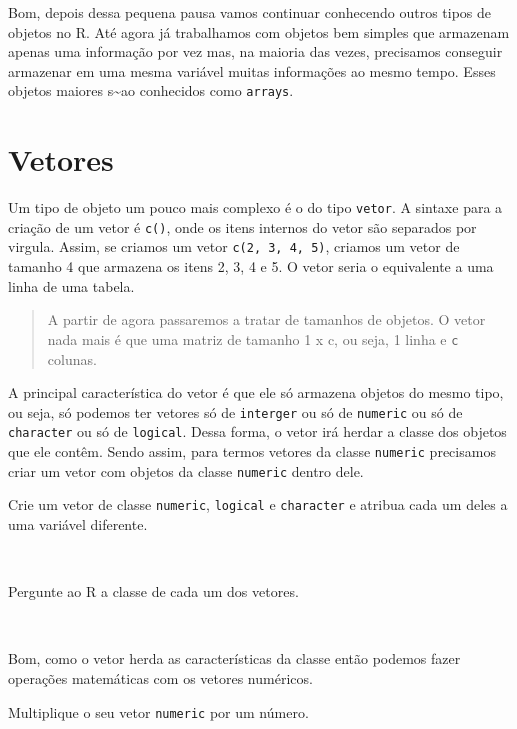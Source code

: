 \documentclass[]{book}
\theoremstyle{definition}
\theoremstyle{definition}
\theoremstyle{definition}
\theoremstyle{remark}
\let\BeginKnitrBlock\begin \let\EndKnitrBlock\end
\begin{document}
Bom, depois dessa pequena pausa vamos continuar conhecendo outros tipos de objetos no R. Até agora já trabalhamos com objetos bem simples que armazenam apenas uma informação por vez mas, na maioria das vezes, precisamos conseguir armazenar em uma mesma variável muitas informações ao mesmo tempo. Esses objetos maiores s\textasciitilde{}ao conhecidos como \texttt{arrays}.

\hypertarget{vetores}{%
\section{Vetores}\label{vetores}}

Um tipo de objeto um pouco mais complexo é o do tipo \texttt{vetor}. A sintaxe para a criação de um vetor é \texttt{c()}, onde os itens internos do vetor são separados por virgula. Assim, se criamos um vetor \texttt{c(2,\ 3,\ 4,\ 5)}, criamos um vetor de tamanho 4 que armazena os itens 2, 3, 4 e 5. O vetor seria o equivalente a uma linha de uma tabela.

\begin{quote}
A partir de agora passaremos a tratar de tamanhos de objetos. O vetor nada mais é que uma matriz de tamanho 1 x c, ou seja, 1 linha e \texttt{c} colunas.
\end{quote}

A principal característica do vetor é que ele só armazena objetos do mesmo tipo, ou seja, só podemos ter vetores só de \texttt{interger} ou só de \texttt{numeric} ou só de \texttt{character} ou só de \texttt{logical}. Dessa forma, o vetor irá herdar a classe dos objetos que ele contêm. Sendo assim, para termos vetores da classe \texttt{numeric} precisamos criar um vetor com objetos da classe \texttt{numeric} dentro dele.

\BeginKnitrBlock{exercise}
\protect\hypertarget{exr:unnamed-chunk-20}{}{\label{exr:unnamed-chunk-20} }Crie um vetor de classe \texttt{numeric}, \texttt{logical} e \texttt{character} e atribua cada um deles a uma variável diferente.
\EndKnitrBlock{exercise}

~

\BeginKnitrBlock{exercise}
\protect\hypertarget{exr:unnamed-chunk-21}{}{\label{exr:unnamed-chunk-21} }Pergunte ao R a classe de cada um dos vetores.
\EndKnitrBlock{exercise}

~

Bom, como o vetor herda as características da classe então podemos fazer operações matemáticas com os vetores numéricos.

\BeginKnitrBlock{exercise}
\protect\hypertarget{exr:unnamed-chunk-22}{}{\label{exr:unnamed-chunk-22} }Multiplique o seu vetor \texttt{numeric} por um número.
\EndKnitrBlock{exercise}
\end{document}
